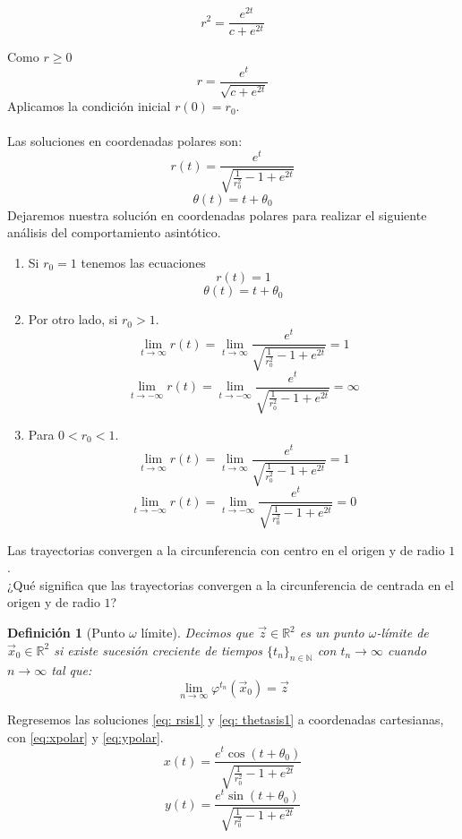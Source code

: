 \documentclass[12pt, a4paper]{report}
\newtheorem{definition}{Definición}
\begin{document}
$$r^2=\frac{e^{2t}}{c+e^{2t}}$$

Como $r\geq 0$
$$r=\frac{e^t}{\sqrt{c+e^{2t}}}$$
Aplicamos la condición inicial $r(0)=r_0$.\\
\\Las soluciones en coordenadas polares son:
\begin{equation}\label{eq: rsis1}
	r(t)=\frac{e^t}{\sqrt{\frac{1}{r_0^2}-1+e^{2t}}}
\end{equation}
\begin{equation}\label{eq: thetasis1}
	\theta(t)=t+\theta_0
\end{equation}
Dejaremos nuestra solución en coordenadas polares para realizar el siguiente
análisis del comportamiento asintótico.\\
\begin{enumerate}
	\item Si $r_0=1$ tenemos las ecuaciones
	      $$r(t)=1$$
	      $$\theta(t)=t+\theta_0$$
	\item Por otro lado, si $r_0>1$.
	      $$\lim_{t\to\infty}r(t)=\lim_{t\to\infty}\frac{e^t}{\sqrt{\frac{1}{r_0^2}-1+e^{2t}}}=1$$
	      $$\lim_{t\to-\infty}r(t)=\lim_{t\to-\infty}\frac{e^t}{\sqrt{\frac{1}{r_0^2}-1+e^{2t}}}=\infty$$
	\item Para $0<r_0<1$.
	      $$\lim_{t\to\infty}r(t)=\lim_{t\to\infty}\frac{e^t}{\sqrt{\frac{1}{r_0^2}-1+e^{2t}}}=1$$
	      $$\lim_{t\to-\infty}r(t)=\lim_{t\to-\infty}\frac{e^t}{\sqrt{\frac{1}{r_0^2}-1+e^{2t}}}=0$$
\end{enumerate}


Las trayectorias convergen a la circunferencia con centro en el origen
y de radio  $1$.\\

¿Qué significa que las trayectorias convergen a la circunferencia de centrada en el origen y de radio $1$?

\begin{definition} [Punto $\omega$ límite]
	Decimos que $\vec{z}\in\mathbb{R}^2$ es un punto $\omega$-límite
	de $\vec{x}_0\in\mathbb{R}^2$ si existe sucesión creciente de
	tiempos $\{t_n\}_{n\in\mathbb{N}}$
	con $t_n \to\infty$ cuando $n\to \infty$ tal que:
	$$\lim_{n\to\infty}\varphi^{t_n}(\vec{x}_0)=\vec{z}$$
\end{definition}

Regresemos las soluciones \eqref{eq: rsis1} y \eqref{eq: thetasis1} a
coordenadas cartesianas, con \eqref{eq:xpolar} y \eqref{eq:ypolar}.
\begin{equation}\label{eq: xsis1}
	x(t)=\frac{e^t\cos(t+\theta_0)}{\sqrt{\frac{1}{r_0^2}-1+e^{2t}}}
\end{equation}
\begin{equation}\label{eq: ysis1}
	y(t)=\frac{e^t\sin(t+\theta_0)}{\sqrt{\frac{1}{r_0^2}-1+e^{2t}}}
\end{equation}
\end{document}
